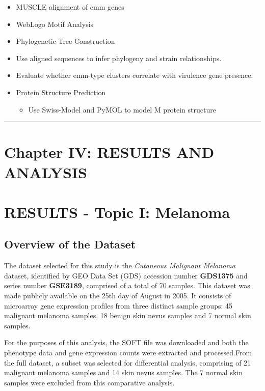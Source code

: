 \documentclass[
]{article}
\providecommand{\tightlist}{%
  \setlength{\itemsep}{0pt}\setlength{\parskip}{0pt}}
\begin{document}
\begin{itemize}
\item
  MUSCLE alignment of emm genes
\item
  WebLogo Motif Analysis
\item
  Phylogenetic Tree Construction
\item
  Use aligned sequences to infer phylogeny and strain relationships.
\item
  Evaluate whether emm-type clusters correlate with virulence gene
  presence.
\item
  Protein Structure Prediction

  \begin{itemize}
  \tightlist
  \item
    Use Swiss-Model and PyMOL to model M protein structure
  \end{itemize}
\end{itemize}

\begin{center}\rule{0.5\linewidth}{0.5pt}\end{center}

\newpage

\section{Chapter IV: RESULTS AND
ANALYSIS}\label{chapter-iv-results-and-analysis}

\section{RESULTS - Topic I: Melanoma}\label{results---topic-i-melanoma}

\subsection{Overview of the Dataset}\label{overview-of-the-dataset}

The dataset selected for this study is the \emph{Cutaneous Malignant
Melanoma} dataset, identified by GEO Data Set (GDS) accession number
\textbf{GDS1375} and series number \textbf{GSE3189}, comprised of a
total of 70 samples. This dataset was made publicly available on the
25th day of August in 2005. It consists of microarray gene expression
profiles from three distinct sample groups: 45 malignant melanoma
samples, 18 benign skin nevus samples and 7 normal skin samples.

For the purposes of this analysis, the SOFT file was downloaded and both
the phenotype data and gene expression counts were extracted and
processed.From the full dataset, a subset was selected for differential
analysis, comprising of 21 malignant melanoma samples and 14 skin nevus
samples. The 7 normal skin samples were excluded from this comparative
analysis.
\end{document}
